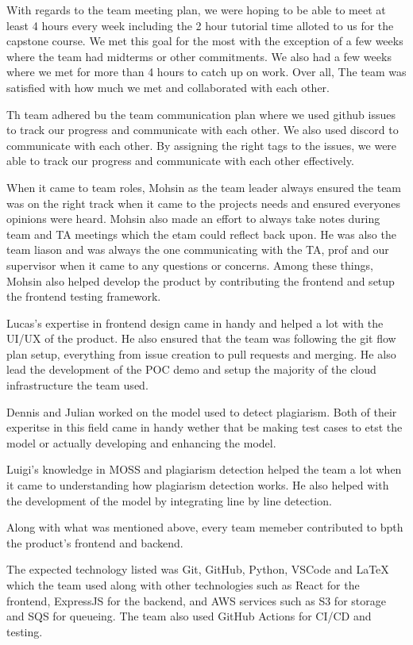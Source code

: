\documentclass{article}
\begin{document}
With regards to the team meeting plan, we were hoping to be able to meet at least 4 hours every week
including the 2 hour tutorial time alloted to us for the capstone course. We met this goal for the most
with the exception of a few weeks where the team had midterms or other commitments. 
We also had a few weeks where we met for more than 4 hours to catch up on work. Over all,
The team was satisfied with how much we met and collaborated with each other.

Th team adhered bu the team communication plan where we used github issues to track our
progress and communicate with each other. We also used discord to communicate with each other.
By assigning the right tags to the issues, we were able to track our progress and communicate with each other effectively.

When it came to team roles, Mohsin as the team leader always ensured the team was on the right
track when it came to the projects needs and ensured everyones opinions were heard. Mohsin also made 
an effort to always take notes during team and TA meetings which the etam could reflect back upon.
He was also the team liason and was always the one communicating with the TA, prof and our supervisor
when it came to any questions or concerns. Among these things, Mohsin also helped develop the product
by contributing the frontend and setup the frontend testing framework.

Lucas's expertise in frontend design came in handy and helped a lot with the UI/UX of the product. He also
ensured that the team was following the git flow plan setup, everything from issue creation to pull requests and merging.
He also lead the development of the POC demo and setup the majority of the cloud infrastructure the team used.

Dennis and Julian worked on the model used to detect plagiarism. Both of their experitse in
this field came in handy wether that be making test cases to etst the model or actually developing and enhancing the model.

Luigi's knowledge in MOSS and plagiarism detection helped the team a lot when it came to understanding how plagiarism detection works.
He also helped with the development of the model by integrating line by line detection.

Along with what was mentioned above, every team memeber contributed to bpth the product's frontend and backend.

The expected technology listed was Git, GitHub, Python, VSCode and LaTeX which the team used along 
with other technologies such as React for the frontend, ExpressJS for the backend, and AWS services 
such as S3 for storage and SQS for queueing. The team also used GitHub Actions for CI/CD and testing.
\end{document}
